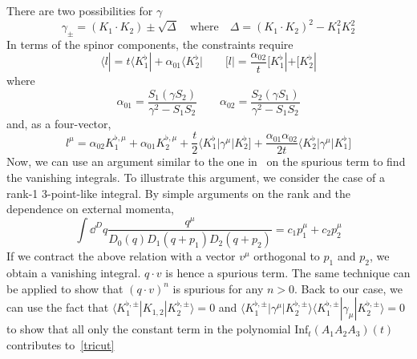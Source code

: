 There are two possibilities for $\gamma$
\begin{equation*}
\gamma_{\pm} = (K_1\cdot K_2) \pm\sqrt{\Delta}\quad
\mathrm{where}\quad
\Delta = (K_1\cdot K_2)^2 - K_1^2K_2^2
\end{equation*}
In terms of the spinor components, the constraints require
\begin{equation*}
\langle l | = t\langle K_1^\flat| + \alpha_{01}\langle K_2^\flat| \quad\quad
[ l | = \frac{\alpha_{02}}{t}[ K_1^\flat| + [ K_2^\flat|
\end{equation*}
where
\begin{equation*}
\alpha_{01} = \frac{S_1(\gamma S_2)}{\gamma^2 - S_1S_2}\quad \quad
\alpha_{02} = \frac{S_2(\gamma S_1)}{\gamma^2 - S_1S_2}
\end{equation*}
%
and, as a four-vector,
\begin{equation*}
l^\mu = \alpha_{02} K_1^{\flat,\mu} + \alpha_{01}K_2^{\flat,\mu} + \frac{t}{2}\langle K_1^\flat | \gamma^\mu |K_2^\flat] + \frac{\alpha_{01}\alpha_{02}}{2t}\langle K_2^\flat|\gamma^\mu |K_1^\flat]
\end{equation*}
%
Now, we can use an argument similar to the one in~\cite{Ossola:2006us} on the spurious term to find the vanishing integrals.
To illustrate this argument, we consider the case of a rank-1 3-point-like integral. 
By simple arguments on the rank and the dependence on external momenta, 
\begin{equation*}
\int\dd^D q \frac{q^\mu}{D_0(q)D_1(q+p_1)D_2(q+p_2)} = c_1p_1^\mu + c_2p_2^\mu
\end{equation*}
If we contract the above relation with a vector $v^\mu$ orthogonal to $p_1$ and $p_2$, we obtain a vanishing integral.
$q\cdot v$ is hence a spurious term.
The same technique can be applied to show that $(q\cdot v)^n$ is spurious for any $n>0$. 
Back to our case, we can use the fact that $\langle K_1^{\flat,\pm} | K_{1,2}|K_2^{\flat,\pm}\rangle = 0 $ and $\langle K_1^{\flat,\pm}|\gamma^\mu|K_{2}^{\flat,\pm}\rangle\langle K_1^{\flat,\pm}|\gamma_\mu|K_{2}^{\flat,\pm}\rangle = 0$
to show that all only the constant term in the polynomial $\mathrm{Inf}_t(A_1A_2A_3)(t)$ contributes to~\cref{tricut}






